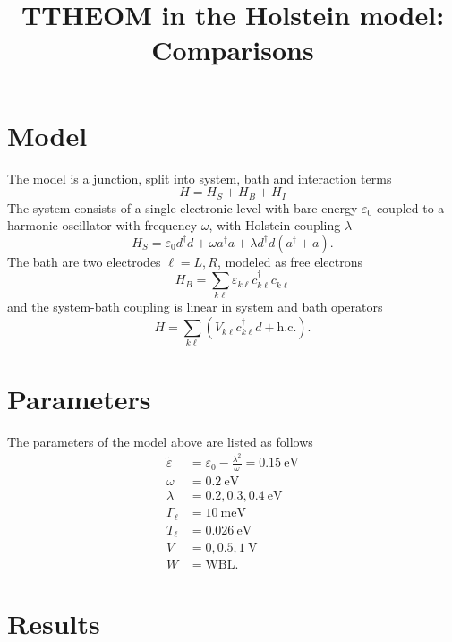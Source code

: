 \documentclass{article}
\newcommand{\pdagger}{{\phantom{\dagger}}}
\begin{document}
\title{TTHEOM in the Holstein model: Comparisons}
\maketitle

\section{Model}
The model is a junction, split into system, bath and interaction terms
\begin{equation}
	H = H_S + H_B + H_I
\end{equation}  
The system consists of a single electronic level with bare energy $\varepsilon_0$ coupled to a harmonic oscillator with frequency $\omega$, with Holstein-coupling $\lambda$
\begin{equation}
	H_S = \varepsilon_0 d^\dagger d + \omega a^\dagger a + \lambda d^\dagger d (a^\dagger + a).
\end{equation}
The bath are two electrodes $\ell=L,R$, modeled as free electrons
\begin{equation}
	H_B = \sum_{k\ell} \varepsilon_{k\ell}c^\dagger_{k\ell}c^\pdagger_{k\ell}
\end{equation}
and the system-bath coupling is linear in system and bath operators
\begin{equation}
	H = \sum_{k\ell} (V_{k\ell} c_{k\ell}^\dagger d + \mathrm{h.c.}).
\end{equation}
\section{Parameters}
The parameters of the model above are listed as follows
\begin{align*}
	\tilde{\varepsilon} &= \varepsilon_0 -\frac{\lambda^2}{\omega} = \SI{0.15}{\electronvolt}\\
	\omega &= \SI{0.2}{\electronvolt}\\
	\lambda &=0.2,0.3,\SI{0.4}{\electronvolt}\\ 
	\Gamma_\ell &= \SI{10}{\milli\electronvolt}\\
	T_\ell &= \SI{0.026}{\electronvolt}\\ 
	V &= 0,0.5,\SI{1}{\volt}\\
	W&=\mathrm{WBL}.
\end{align*}
\clearpage
\section{Results}
\end{document}
